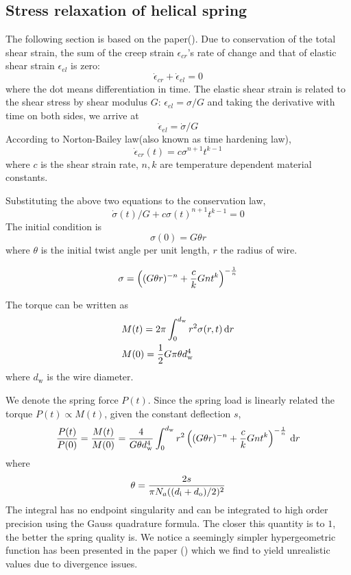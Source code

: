 \documentclass[10pt]{article}
\begin{document}
\subsection{Stress relaxation of helical spring}
The following section is based on the paper(\cite{Relaxation1}). Due to conservation of the total shear strain, the sum of the creep strain $\epsilon_{cr}$'s rate of change and that of elastic shear strain $\epsilon_{el}$ is zero:
\[
\dot{\epsilon}_{cr} + \dot{\epsilon}_{el} = 0
\]
where the dot means differentiation in time. The elastic shear strain is related to the shear stress by shear modulus $G$: $\epsilon_{el} = \sigma/G$ and taking the derivative with time on both sides, we arrive at
\[
\dot{\epsilon}_{el} = \dot{\sigma}/G
\]
According to Norton-Bailey law(also known as time hardening law),
\begin{equation} \label{eq:N-B}
\dot{\epsilon}_{cr}(t)=c\sigma^{n+1} t^{k-1}
\end{equation}
where $c$ is the shear strain rate, $n,k$ are temperature dependent material constants.

Substituting the above two equations to the conservation law,
\begin{equation} \label{eq:diff}
\dot{\sigma}(t)/G+c\sigma(t)^{n+1} t^{k-1}=0
\end{equation}
The initial condition is
\[
\sigma (0) = G\theta r
\]
where $\theta$ is the initial twist angle per unit length, $r$ the radius of wire.

\[
\sigma = \left( (G\theta r)^{-n} + {c\over k} Gnt^k \right)^{-{1\over n}}
\]

The torque can be written as
\begin{align*}
&M(t) = 2\pi \int_0^{d_{\text{w}}} r^2 \sigma(r,t)\,\mathrm{d} r\\
&M(0)={1\over 2} G\pi\theta d_{\text{w}}^4
\end{align*}
where $d_{\text{w}}$ is the wire diameter.

We denote the spring force $P(t)$. Since the spring load is linearly related the torque $P(t)\propto M(t)$, given the constant deflection $s$,
\[
{P(t)\over P(0)} = {M(t)\over M(0)} = {4\over G\theta d_{\text{w}}^4}\int_0^{d_{\text{w}}} r^2 \left( (G\theta r)^{-n} + {c\over k} Gnt^k \right)^{-{1\over n}} \,\mathrm{d} r
\]
where
\[
\theta = {2s\over \pi N_a ((d_{\text{i}}+d_{\text{o}})/2)^2}
\]
The integral has no endpoint singularity and can be integrated to high order precision using the Gauss quadrature formula. The closer this quantity is to $1$, the better the spring quality is. We notice a seemingly simpler hypergeometric function has been presented in the paper (\cite{Ko2014}) which we find to yield unrealistic values due to divergence issues.
\end{document}
